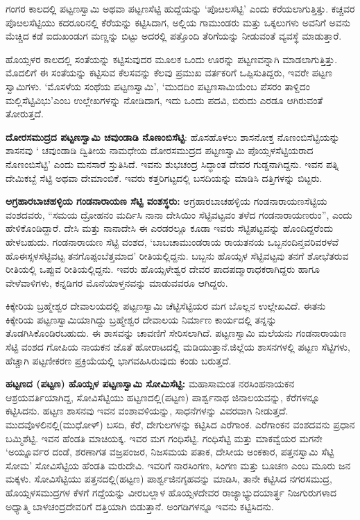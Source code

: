 ಗಂಗರ ಕಾಲದಲ್ಲಿ ಪಟ್ಟಣಸ್ವಾಮಿ ಅಥವಾ ಪಟ್ಟಣಸೆಟ್ಟಿ ಹುದ್ದೆಯನ್ನು ‘ಪೊೞಲಸೆಟ್ಟಿ’ ಎಂದು ಕರೆಯಲಾಗುತ್ತಿತ್ತು. ಕಚ್ಚವರ ಪೊೞಲಸೆಟ್ಟಿಯು ಕದರೂರಿನಲ್ಲಿ ಕೆರೆಯನ್ನು ಕಟ್ಟಿಸಿದಾಗ, ಅಲ್ಲಿಯ ಗಾಮುಂಡರು ಮತ್ತು ಒಕ್ಕಲುಗಳು ಅವನಿಗೆ ಅವನು ಮೆಚ್ಚಿದ ಕಡೆ ಐದುಖಂಡುಗ ಮಣ್ಣನ್ನು ಬಿಟ್ಟು ಅದರಲ್ಲಿ ಪತ್ತೊಂದಿ ತೆರಿಗೆಯನ್ನು ನೀಡುವಂತೆ ವ್ಯವಸ್ಥೆ ಮಾಡುತ್ತಾರೆ.

ಹೊಯ್ಸಳರ ಕಾಲದಲ್ಲಿ ಸಂತೆಯನ್ನು ಕಟ್ಟಿಸುವುದರ ಮೂಲಕ ಒಂದು ಊರನ್ನು ಪಟ್ಟಣವನ್ನಾಗಿ ಮಾಡಲಾಗುತ್ತಿತ್ತು. ಮೊದಲಿಗೆ ಈ ಸಂತೆಯನ್ನು ಕಟ್ಟಿಸುವ ಕೆಲಸವನ್ನು ಕೆಲವು ಪ್ರಮುಖ ವರ್ತಕರಿಗೆ ಒಪ್ಪಿಸುತಿದ್ದರು, ಇವರೇ ಪಟ್ಟಣ ಸ್ವಾಮಿಗಳು. ‘ಮೊಸಳೆಯ ಸಂಥೆಯ ಪಟ್ಟಣಸ್ವಾಮಿ’, ‘ಮುದದಿಂ ಪಟ್ಟಣಸಾಮಿಯೆಂಬ ಪೆಸರಂ ತಾಳ್ದಿದಂ ಮಲ್ಲಿಸೆಟ್ಟಿವಿಭು’ಎಂಬ ಉಲ್ಲೇಖಗಳನ್ನು ನೋಡಿದಾಗ, ಇದು ಒಂದು ಪದವಿ, ಬಿರುದು ಎರಡೂ ಆಗಿರುವಂತೆ ತೋರುತ್ತದೆ.

\textbf{ದೋರಸಮುದ್ರದ ಪಟ್ಟಣಸ್ವಾಮಿ ಚವುಂಡಾಡಿ ನೊಣಂಬಿಸೆಟ್ಟಿ}: ಹೊಸಹೊಳಲು ಶಾಸನೋಕ್ತ ನೊಣಂಬಿಸೆಟ್ಟಿಯನ್ನು ಶಾಸನವು ‘ ಚವುಂಡಾಡಿ ದ್ವಿತೀಯ ನಾಮಧೇಯ ದೋರಸಮುದ್ರದ ಪಟ್ಟಣಸ್ವಾಮಿ ಪೊಯ್ಸಳಸೆಟ್ಟಿಯರಾದ ನೊಣಂಬಿಸೆಟ್ಟಿ’ ಎಂದು ಮನಸಾರೆ ಸ್ತುತಿಸಿದೆ. ಇವನು ಶುಭಚಂದ್ರ ಸಿದ್ಧಾಂತ ದೇವರ ಗುಡ್ಡನಾಗಿದ್ದನು. ಇವನ ಪತ್ನಿ ದೇಮಿಕಬ್ಬೆ ಸೆಟ್ಟಿ ಅಥವಾ ದೇಮಾಂಬಿಕೆ. ಇವರು ಕತ್ತರಿಗಟ್ಟದಲ್ಲಿ ಬಸದಿಯನ್ನು ಮಾಡಿಸಿ ದತ್ತಿಗಳನ್ನು ಬಿಟ್ಟರು.

\textbf{ಅಗ್ರಹಾರಬಾಚಹಳ್ಳಿಯ ಗಂಡನಾರಾಯಣ ಸೆಟ್ಟಿ ವಂಶಸ್ಥರು: } ಅಗ್ರಹಾರಬಾಚಹಳ್ಳಿಯ ಗಂಡನಾರಾಯಣಸೆಟ್ಟಿಯ ವಂಶದವರು, “ಸಮಯ ದ್ರೋಹನಂ ಮರ್ದಿಸಿ ನಾನಾ ದೇಸಿಯಿಂ ಸೆಟ್ಟಿವಟ್ಟವಂ ತಳೆದ ಗಂಡನಾರಾಯಣರುಂ”, ಎಂದು ಹೇಳಿಕೊಂಡಿದ್ದಾರೆ. ದೇಸಿ ಮತ್ತು ನಾನಾದೇಸಿ ಈ ಎರಡರಲ್ಲೂ ಕೂಡಾ ಇವರು ಸೆಟ್ಟಿಪಟ್ಟವನ್ನು ಹೊಂದಿದ್ದರೆಂದು ಹೇಳಬಹುದು. ಗಂಡನಾರಾಯಣ ಸೆಟ್ಟಿ ವಂಶದ, ‘ಬಾಬಚಾಮುಂಡರಾಯ ರಾಯತನಯ ಒಬ್ಬನಂದಿನ್ತವರಿವರಳವೆ ಹೊಈಸ್ಸಳಸೆಟ್ಟಿವಟ್ಟ ತನಗೊಪ್ಪಂಬೆತ್ತಮಾದ’ ರೀತಿಯಲ್ಲಿದ್ದನು. ಬಬ್ಬನು ಹೊಯ್ಸಳ ಸೆಟ್ಟಿವಟ್ಟವು ತನಗೆ ಶೋಭೆತರುವ ರೀತಿಯಲ್ಲಿ ಒಪ್ಪುವ ರೀತಿಯಲ್ಲಿದ್ದನು. ಇವರು ಹೊಯ್ಸಳೇಶ್ವರ ದೇವರ ಪಾದಪದ್ಮಾರಾಧಕರಾಗಿದ್ದರು ಹಾಗೂ ವೇಳೆವಾಳಿಗಳು, ಕನ್ನಡಿಗರ ಮೊನೆಯಾಳ್ತನವನ್ನು ಮಾಡುವವರೂ ಆಗಿದ್ದರು.

ಕಿಕ್ಕೇರಿಯ ಬ್ರಹ್ಮೇಶ್ವರ ದೇವಾಲಯದಲ್ಲಿ ಪಟ್ಟಣಸ್ವಾಮಿ ಚೆಟ್ಟಿಸೆಟ್ಟಿಯರ ಮಗ ಬೊಲ್ಲನ ಉಲ್ಲೇಖವಿದೆ. ಈತನು ಕಿಕ್ಕೇರಿಯ ಪಟ್ಟಣಸ್ವಾಮಿಯಾಗಿದ್ದು ಬ್ರಹ್ಮೇಶ್ವರ ದೇವಾಲಯ ನಿರ್ಮಾಣ ಕಾರ್ಯದಲ್ಲಿ ತನ್ನನ್ನು ತೊಡಗಿಸಿಕೊಂಡಿರಬಹುದು. ಈ ಶಾಸವನ್ನು ಚಾವಣಿಗೆ ಸೇರಿಸಲಾಗಿದೆ. ಪಟ್ಟಣಸ್ವಾಮಿ ಮಲೆಯನು ಗಂಡನಾರಾಯಣ ಸೆಟ್ಟಿ ವಂಶದ ಗೋಪಿಯ ನಾಯಕನ ಜೊತೆ ಹೋರಾಟದಲ್ಲಿ ಮಡಿಯುತ್ತಾನೆ.ಜಿಲ್ಲೆಯ ಶಾಸನಗಳಲ್ಲಿ ಪಟ್ಟಣ ಸೆಟ್ಟಿಗಳು, ಹೆಚ್ಚಾಗಿ ಪಟ್ಟಣೀಕರಣ ಪ್ರಕ್ರಿಯೆಯಲ್ಲಿ ಭಾಗವಹಿಸಿರುವುದು ಕಂಡು ಬರುತ್ತದೆ.

\textbf{ಹಟ್ಟಣದ (ಪಟ್ಟಣ) ಹೊಯ್ಸಳ ಪಟ್ಟಣಸ್ವಾಮಿ ಸೋಮಿಸೆಟ್ಟಿ: } ಮಹಾಸಾಮಂತ ನರಸಿಂಹನಾಯಕನ ಆಶ್ರಯವರ್ತಿ\-ಯಾಗಿದ್ದ, ಸೋವಿಸೆಟ್ಟಿಯು ಹಟ್ಟಣದಲ್ಲಿ(ಪಟ್ಟಣ) ಪಾರ್ಶ್ವನಾಥ ಜಿನಾಲಯವನ್ನು, ಕೆರೆಗಳನ್ನೂ ಕಟ್ಟಿಸಿದನು. ಹಟ್ಟಣ ಶಾಸನವು ಇವನ ವಂಶಾವಳಿಯನ್ನು, ಸಾಧನೆಗಳನ್ನು ವಿವರವಾಗಿ ನೀಡುತ್ತದೆ. ಮುದವೊಳಲಿನಲ್ಲಿ(ಮುಧೋಳ್​) ಬಸದಿ, ಕೆರೆ, ದೇಗುಲಗಳನ್ನು ಕಟ್ಟಿಸಿದ ಎರೆಗಾಂಕ. ಎರೆಗಾಂಕನ ವಂಶದವನು ಪ್ರಧಾನ ಬಮ್ಮಿಶೆಟ್ಟಿ. ಇವನ ಹೆಂಡತಿ ಮಾಚಿಯಕ್ಕ. ಇವರ ಮಗ ಗಂಧಿಸೆಟ್ಟಿ. ಗಂಧಿಸೆಟ್ಟಿ ಮತ್ತು ಮಾಕವ್ವೆಯರ ಮಗನೇ ‘ಅಯ್ನೂರ್ವರ ದಂಡೆ, ಶರಣಾಗತ ವಜ್ರಪಂಜರ, ನಿಜಸಮಯ ಪತಾಕ, ದೇಸೀಯ ಅಂಕಕಾರ, ಪತ್ತನಸ್ವಾಮಿ ಸೆಟ್ಟಿ ಸೋಮ’ ಸೋವಿಸೆಟ್ಟಿಯ ಹೆಂಡತಿ ಮರುದೇವಿ. ಇವರಿಗೆ ನಾರಸಿಂಗಣ, ಸಿಂಗಣ ಮತ್ತು ಬೂಚಣ ಎಂಬ ಮೂರು ಜನ ಮಕ್ಕಳು. ಸೋವಿಸೆಟ್ಟಿಯು ಪತ್ತನದಲ್ಲಿ(ಹಟ್ಟಣ) ಪಾರ್ಶ್ವಜಿನಗೃಹವನ್ನು ಮಾಡಿಸಿ, ತಾನೇ ಕಟ್ಟಿಸಿದ ನಗರಸಮುದ್ರ, ಹೊಯ್ಸಳಸಮುದ್ರಗಳ ಕೆಳಗೆ ಗದ್ದೆಯನ್ನು ವೀರಬಲ್ಲಾಳ ಹೊಯ್ಸಳದೇವರ ರಾಜ್ಯಾಭ್ಯುದಯಾರ್ತ್ಥ ನಿಜಗುರುಗಳಾದ ಅಧ್ಯಾತ್ಮಿ ಬಾಳಚಂದ್ರದೇವರಿಗೆ ದತ್ತಿಯಾಗಿ ಬಿಡುತ್ತಾನೆ. ಅಂಗಡಿಗಳನ್ನೂ ಇವನು ಕಟ್ಟಿಸಿದನು.

